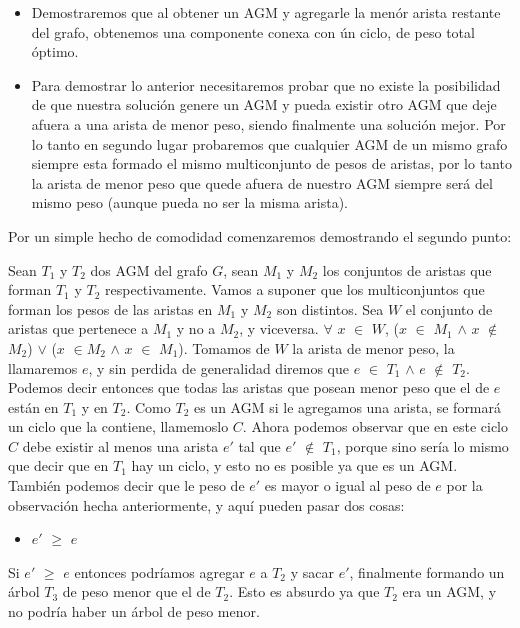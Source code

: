 \begin{itemize}
\item Demostraremos que al obtener un AGM y agregarle la men\'or arista restante del grafo, obtenemos una componente conexa con \'un ciclo, de peso total óptimo.
\item Para demostrar lo anterior necesitaremos probar que no existe la posibilidad de que nuestra soluci\'on genere un AGM y pueda existir otro AGM que deje afuera a una arista de menor peso, siendo finalmente una soluci\'on mejor. Por lo tanto en segundo lugar probaremos que cualquier AGM de un mismo grafo siempre esta formado el mismo multiconjunto de pesos de aristas, por lo tanto la arista de menor peso que quede afuera de nuestro AGM siempre será del mismo peso (aunque pueda no ser la misma arista).
\end{itemize}

Por un simple hecho de comodidad comenzaremos demostrando el segundo punto:

Sean $T_1$ y $T_2$ dos AGM del grafo $G$, sean $M_1$ y $M_2$ los conjuntos de aristas que forman $T_1$ y $T_2$ respectivamente. Vamos a suponer que los multiconjuntos que forman los pesos de las aristas en $M_1$ y $M_2$ son distintos. Sea $W$ el conjunto de aristas que pertenece a $M_1$ y no a $M_2$, y viceversa. $\forall$ $x$ $\in$ $W$, ($x$ $\in$ $M_1$ $\wedge$ $x$ $\notin$ $M_2$) $\vee$ ($x$ $\in $$M_2$ $\wedge$ $x$ $\in$ $M_1$).
Tomamos de $W$ la arista de menor peso, la llamaremos $e$, y sin perdida de generalidad diremos que $e$ $\in$ $T_1$ $\wedge$ $e$ $\notin$ $T_2$. Podemos decir entonces que todas las aristas que posean menor peso que el de $e$ est\'an en $T_1$ y en $T_2$.
Como $T_2$ es un AGM si le agregamos una arista, se formar\'a un ciclo que la contiene, llamemoslo $C$. Ahora podemos observar que en este ciclo $C$ debe existir al menos una arista $e'$ tal que $e'$ $\notin$ $T_1$, porque sino ser\'ia lo mismo que decir que en $T_1$ hay un ciclo, y esto no es posible ya que es un AGM. Tambi\'en podemos decir que le peso de $e'$ es mayor o igual al peso de $e$ por la observaci\'on hecha anteriormente, y aqu\'i pueden pasar dos cosas:
\begin{itemize}
\item $e'$ $\geq$ $e$
\end{itemize}
Si $e'$ $\geq$ $e$  entonces podr\'iamos agregar $e$ a $T_2$ y sacar $e'$, finalmente formando un \'arbol $T_3$ de peso menor que el de $T_2$. Esto es absurdo ya que $T_2$ era un AGM, y no podr\'ia haber un \'arbol de peso menor.

